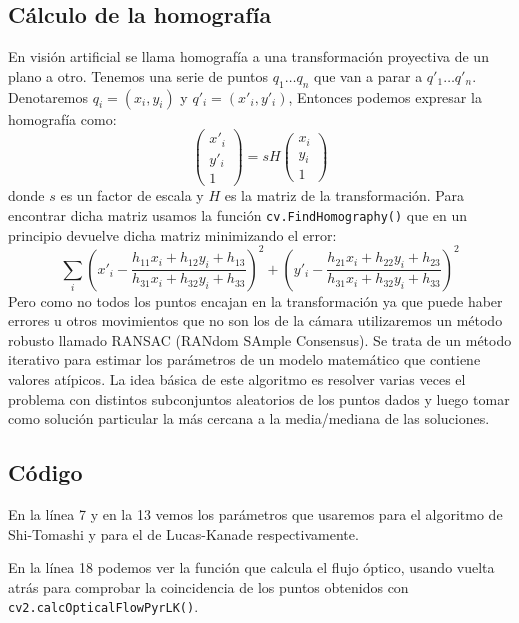 \documentclass[a4paper,openright, 12pt]{book}
\begin{document}
\subsection{Cálculo de la homografía}
En visión artificial se llama homografía a una transformación proyectiva de un plano a otro.
\newline
Tenemos una serie de puntos $q_1 \ldots q_n$ que van a parar a $q'_1 \ldots q'_n$. Denotaremos $q_i = (x_i,y_i)$ y $q'_i=(x'_i, y'_i)$,
Entonces podemos expresar la homografía como:
\begin{equation}
	\left( \begin{array}{c}
	x'_i\\
	y'_i\\
	1
	\end{array} \right)
	= sH
		\left( \begin{array}{c}
	x_i\\
	y_i\\
	1
	\end{array} \right)
\end{equation}
donde $s$ es un factor de escala y $H$ es la matriz de la transformación.
Para encontrar dicha matriz usamos la función \lstinline|cv.FindHomography()|
que en un principio devuelve dicha matriz minimizando el error:
\begin{equation*}
\sum_i \left( x'_i - \dfrac{h_{11}x_i + h_{12}y_i + h_{13}}{h_{31}x_i + h_{32}y_i + h_{33}} \right) ^2  
+ 
\left( y'_i - \dfrac{h_{21}x_i + h_{22}y_i + h_{23}}{h_{31}x_i + h_{32}y_i + h_{33}} \right) ^2 
\end{equation*}
Pero como no todos los puntos encajan en la transformación ya que puede haber errores u otros movimientos que no son los de la cámara utilizaremos un método robusto llamado RANSAC (RANdom SAmple Consensus). Se trata de un método iterativo para estimar los parámetros de un modelo matemático que contiene valores atípicos. La idea básica de este algoritmo es resolver varias veces el problema con distintos subconjuntos aleatorios de los puntos dados y luego tomar como solución particular la más cercana a la media/mediana de las soluciones.
\newpage
\subsection{Código}

En la línea 7 y en la 13 vemos los parámetros que usaremos para el algoritmo de Shi-Tomashi y para el de Lucas-Kanade respectivamente.

En la línea 18 podemos ver la función que calcula el flujo óptico, usando vuelta atrás para comprobar la coincidencia de los puntos obtenidos con \lstinline|cv2.calcOpticalFlowPyrLK()|.
\end{document}
